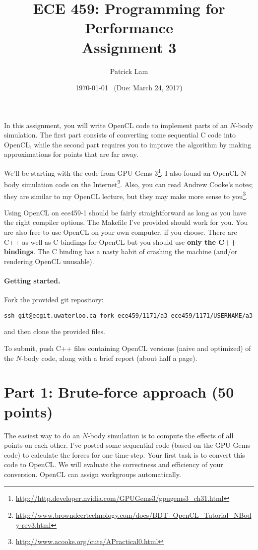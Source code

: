 \documentclass[letterpaper,10pt]{article}
\title{\bf ECE 459: Programming for Performance\\Assignment 3}
\author{Patrick Lam}
\date{\today ~ (Due: March 24, 2017)}
\begin{document}
\maketitle

In this assignment, you will write OpenCL code to implement parts of
an $N$-body simulation.  The first part consists of converting some
sequential C code into OpenCL, while the second part requires you to
improve the algorithm by making approximations for points that are far
away.

We'll be starting with the code from GPU Gems 3\footnote{\url{http://http.developer.nvidia.com/GPUGems3/gpugems3_ch31.html}}.
I also found an OpenCL N-body simulation code on the Internet\footnote{\url{http://www.browndeertechnology.com/docs/BDT_OpenCL_Tutorial_NBody-rev3.html}}. Also, you can read Andrew Cooke's notes; they are similar to my OpenCL lecture, but they may make more sense to you\footnote{\url{http://www.acooke.org/cute/APractical0.html}}.

Using OpenCL on ece459-1 should be fairly straightforward as long as
you have the right compiler options. The Makefile I've provided
should work for you. You are also free to use OpenCL on your own
computer, if you choose. There are C++ as well as C bindings for OpenCL but you should use \textbf{only the C++ bindings}. The C binding has a nasty habit of crashing the machine (and/or rendering OpenCL unusable).

\paragraph{Getting started.} Fork the provided git repository:
\begin{center}
{\tt ssh git@ecgit.uwaterloo.ca fork ece459/1171/a3 ece459/1171/USERNAME/a3}
\end{center}
\noindent and then clone the provided files.

To submit, push C++ files containing OpenCL versions (naive and optimized) of
the $N$-body code, along with a brief report (about half a page).

\section*{Part 1: Brute-force approach (50 points)}
The easiest way to do an $N$-body simulation is to compute the effects
of all points on each other. I've posted some sequential code (based
on the GPU Gems code) to calculate the forces for one time-step. Your
first task is to convert this code to OpenCL. We will evaluate the
correctness and efficiency of your conversion. OpenCL can assign
workgroups automatically.
\end{document}
